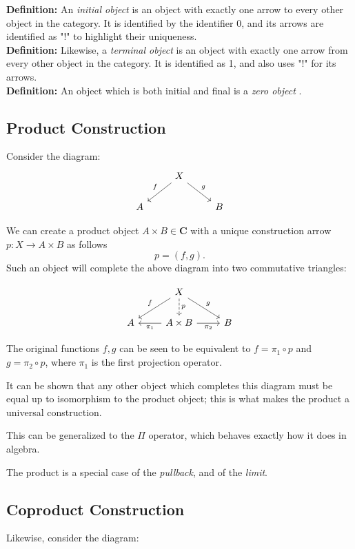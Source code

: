 \documentclass[]{article}
\newcommand{\what}{}
\newcommand{\cat}[1]{\mathbf{#1}}
\newcommand{\defn}[2]{
\renewcommand{\what}{\textit{#1} }
\textbf{Definition:} #2\\
}
\newcommand{\cdr}[1]{\arrow[swap]{r}{#1}}
\newcommand{\cdl}[1]{\arrow{l}{#1}}
\begin{document}
\defn{initial object}{An \what is an object with exactly one arrow to every other object in the category. It is identified by the identifier 0, and its arrows are identified as "!" to highlight their uniqueness.}

\defn{terminal object}{Likewise, a \what is an object with exactly one arrow from every other object in the category. It is identified as 1, and also uses "!" for its arrows.}

\defn{zero object}{An object which is both initial and final is a \what.}



\subsection{Product Construction}
Consider the diagram:
$$\begin{tikzcd}
\phantom{} & \arrow[swap]{dl}{f} X \arrow{dr}{g} & \\
A & & B
\end{tikzcd}$$

We can create a product object $A\times B \in \cat{C}$ with a unique construction arrow $p: X \to A\times B$ as follows $$p = (f, g) .$$
Such an object will complete the above diagram into two commutative triangles:

$$\begin{tikzcd}
\phantom{} & \arrow[swap]{dl}{f} X \arrow[dashed]{d}{p} \arrow{dr}{g} & \\
A & \cdl{\pi_1} A \times B \cdr{\pi_2} & B
\end{tikzcd}$$

The original functions $f, g$ can be seen to be equivalent to $f = \pi_1 \circ p$ and $g = \pi_2 \circ p$, where $\pi_1$ is the first projection operator.

It can  be shown that any other object which completes this diagram must be equal up to isomorphism to the product object; this is what makes the product a universal construction.

This can be generalized to the $\Pi$ operator, which behaves exactly how it does in algebra.

The product is a special case of the \textit{pullback}, and of the \textit{limit}.

\subsection{Coproduct Construction}
Likewise, consider the diagram:
\end{document}
